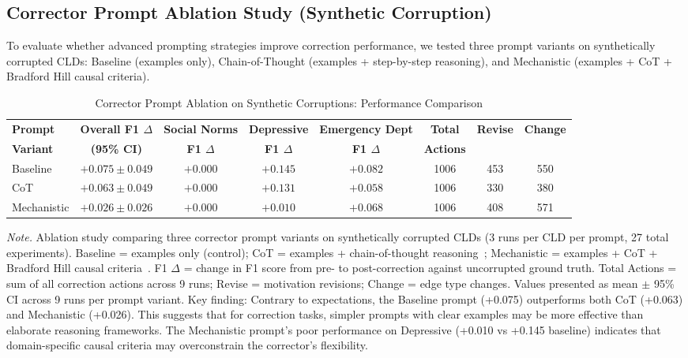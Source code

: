 \subsection{Corrector Prompt Ablation Study (Synthetic Corruption)}

To evaluate whether advanced prompting strategies improve correction performance, we tested three prompt variants on synthetically corrupted CLDs: Baseline (examples only), Chain-of-Thought (examples + step-by-step reasoning), and Mechanistic (examples + CoT + Bradford Hill causal criteria).

\begin{table}[H]
\centering
\caption{Corrector Prompt Ablation on Synthetic Corruptions: Performance Comparison}
\label{tab:rq1b_prompt_ablation_synthetic}
\begin{threeparttable}
\begin{tabular}{lccccccc}
\toprule
\textbf{Prompt} & \textbf{Overall F1 $\Delta$} & \textbf{Social Norms} & \textbf{Depressive} & \textbf{Emergency Dept} & \textbf{Total} & \textbf{Revise} & \textbf{Change} \\
\textbf{Variant} & \textbf{(95\% CI)} & \textbf{F1 $\Delta$} & \textbf{F1 $\Delta$} & \textbf{F1 $\Delta$} & \textbf{Actions} & & \\
\midrule
Baseline        & $\mathbf{+0.075 \pm 0.049}$ & $+0.000$ & $\mathbf{+0.145}$ & $+0.082$ & 1006 & 453 & 550 \\
\midrule
CoT             & $+0.063 \pm 0.049$ & $+0.000$ & $+0.131$ & $+0.058$ & 1006 & 330 & 380 \\
\midrule
Mechanistic     & $+0.026 \pm 0.026$ & $+0.000$ & $+0.010$ & $+0.068$ & 1006 & 408 & 571 \\
\bottomrule
\end{tabular}
\begin{tablenotes}
\small
\item \textit{Note.} Ablation study comparing three corrector prompt variants on synthetically corrupted CLDs (3 runs per CLD per prompt, 27 total experiments). 
Baseline = examples only (control); CoT = examples + chain-of-thought reasoning~\citep{kojima2022large}; Mechanistic = examples + CoT + Bradford Hill causal criteria~\citep{shimonovich2020bradford}.
F1 $\Delta$ = change in F1 score from pre- to post-correction against uncorrupted ground truth.
Total Actions = sum of all correction actions across 9 runs; Revise = motivation revisions; Change = edge type changes.
Values presented as mean $\pm$ 95\% CI across 9 runs per prompt variant.
Key finding: Contrary to expectations, the Baseline prompt (+0.075) outperforms both CoT (+0.063) and Mechanistic (+0.026). This suggests that for correction tasks, simpler prompts with clear examples may be more effective than elaborate reasoning frameworks. The Mechanistic prompt's poor performance on Depressive (+0.010 vs +0.145 baseline) indicates that domain-specific causal criteria may overconstrain the corrector's flexibility.
\end{tablenotes}
\end{threeparttable}
\end{table}

